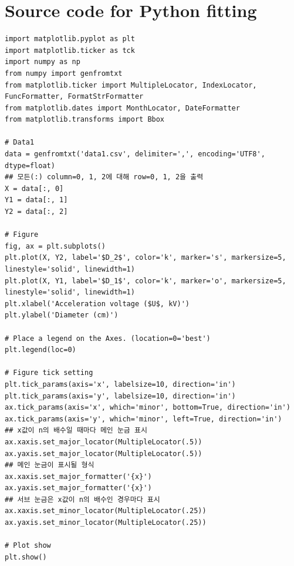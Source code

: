 \documentclass[a4paper, 10pt, nanum]{CSUniSchoolLabReport}
\begin{document}

\section{Source code for Python fitting}


\begin{listing}[ht!]
	\begin{verbatim}
import matplotlib.pyplot as plt
import matplotlib.ticker as tck
import numpy as np
from numpy import genfromtxt
from matplotlib.ticker import MultipleLocator, IndexLocator, FuncFormatter, FormatStrFormatter
from matplotlib.dates import MonthLocator, DateFormatter
from matplotlib.transforms import Bbox

# Data1
data = genfromtxt('data1.csv', delimiter=',', encoding='UTF8', dtype=float)
## 모든(:) column=0, 1, 2에 대해 row=0, 1, 2을 출력
X = data[:, 0]
Y1 = data[:, 1]
Y2 = data[:, 2]

# Figure
fig, ax = plt.subplots()
plt.plot(X, Y2, label='$D_2$', color='k', marker='s', markersize=5, linestyle='solid', linewidth=1)
plt.plot(X, Y1, label='$D_1$', color='k', marker='o', markersize=5, linestyle='solid', linewidth=1)
plt.xlabel('Acceleration voltage ($U$, kV)')
plt.ylabel('Diameter (cm)')

# Place a legend on the Axes. (location=0='best')
plt.legend(loc=0)

# Figure tick setting
plt.tick_params(axis='x', labelsize=10, direction='in')
plt.tick_params(axis='y', labelsize=10, direction='in')
ax.tick_params(axis='x', which='minor', bottom=True, direction='in')
ax.tick_params(axis='y', which='minor', left=True, direction='in')
## x값이 n의 배수일 때마다 메인 눈금 표시
ax.xaxis.set_major_locator(MultipleLocator(.5)) 
ax.yaxis.set_major_locator(MultipleLocator(.5))
## 메인 눈금이 표시될 형식
ax.xaxis.set_major_formatter('{x}')
ax.yaxis.set_major_formatter('{x}')
## 서브 눈금은 x값이 n의 배수인 경우마다 표시
ax.xaxis.set_minor_locator(MultipleLocator(.25)) 
ax.yaxis.set_minor_locator(MultipleLocator(.25))

# Plot show
plt.show()
	\end{verbatim}
	\caption{Example from external file}
	\label{listing:graph1-code}
\end{listing}
\end{document}
